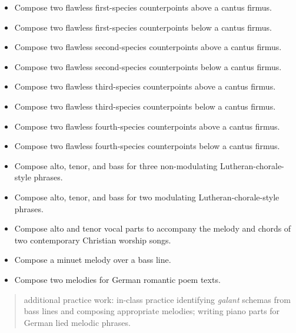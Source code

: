 \begin{itemize}
\item Compose two flawless first-species counterpoints above a cantus firmus.

\item Compose two flawless first-species counterpoints below a cantus firmus.

\item Compose two flawless second-species counterpoints above a cantus firmus.

\item Compose two flawless second-species counterpoints below a cantus firmus.

\item Compose two flawless third-species counterpoints above a cantus firmus.

\item Compose two flawless third-species counterpoints below a cantus firmus.

\item Compose two flawless fourth-species counterpoints above a cantus firmus.

\item Compose two flawless fourth-species counterpoints below a cantus firmus.

\item Compose alto, tenor, and bass for three non-modulating Lutheran-chorale-style phrases.

\item Compose alto, tenor, and bass for two modulating Lutheran-chorale-style phrases.

\item Compose alto and tenor vocal parts to accompany the melody and chords of two contemporary Christian worship songs.

\item Compose a minuet melody over a bass line.

\item Compose two melodies for German romantic poem texts.

\end{itemize}

\begin{quote}

additional practice work: in-class practice identifying \emph{galant} schemas from bass lines and composing appropriate melodies; writing piano parts for German lied melodic phrases.
\end{quote}

